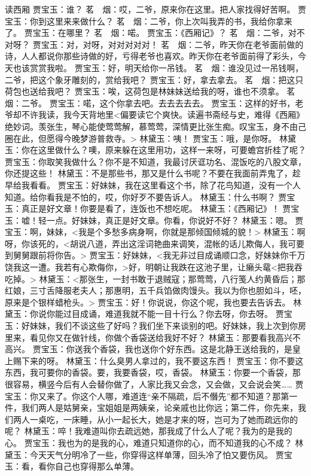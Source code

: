\documentclass{article}
\begin{document}
读西厢
贾宝玉：谁？
茗　烟：哎，二爷，原来你在这里。把人家找得好苦啊。
贾宝玉：你到这里来来做什么？
茗　烟：二爷，你上次叫我弄的书，我给你拿来了。
贾宝玉：在哪里？
茗　烟：喏。
贾宝玉：《西厢记》？
茗　烟：二爷，对不对呀？
贾宝玉：对，对呀，对对对对对！
茗　烟：二爷，昨天你在老爷面前做的诗，人人都说你那些诗做的好，亏得老爷也喜欢。昨天你在老爷面前得了彩头，今天也该赏赏我啦。
贾宝玉：好，明天给你一吊钱。
茗　烟：谁没见过一吊钱啊，二爷，把这个象牙雕刻的，赏给我吧？
贾宝玉：好，拿去拿去。
茗　烟：把这只荷包也送给我吧？
贾宝玉：唉，这荷包是林妹妹送给我的呀，谁也不须拿。
茗　烟：二爷。
贾宝玉：喏，这个你拿去吧。去去去去去。
贾宝玉：这样的好书，老爷却不许我读，我今天背地里<偏要读它个爽快。读遍书斋经与史，难得《西厢》绝妙词。羡张生，琴心能使莺莺解，慕莺莺，深情更比张生痴。叹宝玉，身不由己圈在此，但愿得今晚梦游普救寺。>
林黛玉：咦！
贾宝玉：哦，是你呀。
林黛玉：你在这里做什么？噢，原来躲在这里用功，这样一来呀，可要蟾宫折桂了呢？
贾宝玉：你取笑我做什么？你不是不知道，我最讨厌诓功名、混饭吃的八股文章，你还提这些！
林黛玉：不是那些书，那又是什么书呢？不要在我面前弄鬼了，趁早给我看看。
贾宝玉：好妹妹，我在这里看这个书，除了花鸟知道，没有一个人知道。给你看我是不怕的，哎，你好歹不要告诉人。
林黛玉：什么书啊？
贾宝玉：真正是好文章！你要是看了，连饭也不想吃呢。
林黛玉：《西厢记》！
贾宝玉：嘘！轻一点。好妹妹，真正是好文章。你看，你说好不好？
林黛玉：嗯。
贾宝玉：啊，妹妹，<我是个多愁多病身啊，你就是那倾国倾城的貌！>
林黛玉：啊呀，你该死的，<胡说八道，弄出这淫词艳曲来调笑，混帐的话儿欺侮人，我可要到舅舅跟前将你告。>
贾宝玉：好妹妹，<我无非过目成诵顺口念，好妹妹你千万饶我这一遭。我若有心欺侮你，>好，明朝让我跌在这池子里，让癞头鼋<把我吞吃掉。>
林黛玉：<那张生，一封书敢于退贼寇；那莺莺，八行笺人约黄昏后；那红娘，三寸舌降服老夫人；那惠明，五千兵馅做肉馒头。我以为你也胆如斗，呸，原来是个银样蜡枪头。>
贾宝玉：好！你说说，你这个呢，我也要去告诉去。
林黛玉：你说你能过目成诵，难道我就不能一目十行么？你去呀，你去呀。
贾宝玉：好妹妹，我们不谈这些了好吗？我们坐下来谈别的吧。好妹妹，我上次到你房里来，看见你又在做针线，你做个香袋送给我好不好？
林黛玉：那要看我高兴不高兴。
贾宝玉：你送我个香袋，我也送你个好东西。这是北静王送给我的，是皇上赐下来的呀。
林黛玉：什么臭男人拿过的，我不要这东西！
贾宝玉：你不要这东西，我可要你的香袋。要，我要香袋，哎，香袋。
林黛玉：你要一个香袋，那很容易，横竖今后有人会替你做了，人家比我又会念，又会做，又会说会笑……
贾宝玉：你又来了。你这个人哪，难道连“亲不隔疏，后不僭先”都不知道？那第一件，我们两人是姑舅亲，宝姐姐是两姨亲，论亲戚也比你远；第二件，你先来，我们两人一桌吃，一床睡，从小一起长大，她是才来的呀，岂可为了她而疏远你的呢？
林黛玉：啐！我难道叫你去疏远她，那我成了什么人了呢？我为的是我的心。
贾宝玉：我也为的是我的心，难道只知道你的心，而不知道我的心不成？
林黛玉：今天天气分明冷了一些，你穿得这样单薄，回头冷了怕又要伤风。
贾宝玉：看，看你自己也穿得那么单薄。
\end{document}
